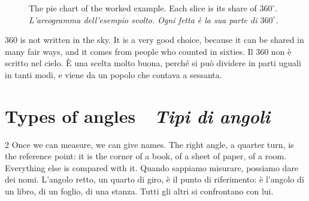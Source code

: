\documentclass[10pt,a4paper,oneside]{book}
\newif\ifIT
\newenvironment{bi}%
  {\begin{paracol}{2}\global\ITfalse\selectlanguage{english}}%
  {\end{paracol}}
\newcommand{\IT}{\switchcolumn\global\ITtrue\selectlanguage{italian}}
\newcommand{\bisection}[2]{%
  \Needspace{7\baselineskip}%
  \section[#1 \textperiodcentered\ #2]{#1 {\color{itgreen}\itshape\,\textperiodcentered\ #2}}}
\newcommand{\bicap}[2]{\caption{#1\\{\color{itgreen}\itshape #2}}}
\begin{document}
\begin{figure}[htbp]
\centering
\bicap{The pie chart of the worked example. Each slice is its share of $360^\circ$.}%
      {L'areogramma dell'esempio svolto. Ogni fetta è la sua parte di $360^\circ$.}
\label{fig:pie}
\end{figure}

\begin{keyidea}{}{}
360 is not written in the sky. It is a very good choice, because it can be shared in many fair ways, and it comes from people who counted in sixties.
\tcblower
Il 360 non è scritto nel cielo. È una scelta molto buona, perché si può dividere in parti uguali in tanti modi, e viene da un popolo che contava a sessanta.
\end{keyidea}

\bisection{Types of angles}{Tipi di angoli}\label{sec:types}
\begin{bi}
Once we can measure, we can give names. The right angle, a quarter turn, is the reference point: it is the corner of a book, of a sheet of paper, of a room. Everything else is compared with it.
\IT
Quando sappiamo misurare, possiamo dare dei nomi. L'angolo retto, un quarto di giro, è il punto di riferimento: è l'angolo di un libro, di un foglio, di una stanza. Tutti gli altri si confrontano con lui.
\end{bi}
\end{document}
